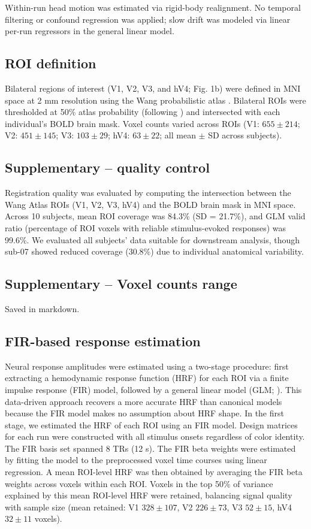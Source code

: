 Within-run head motion was estimated via rigid-body realignment. No temporal filtering or confound regression was applied; slow drift was modeled via linear per-run regressors in the general linear model.

\subsection*{ROI definition}

Bilateral regions of interest (V1, V2, V3, and hV4; Fig. 1b) were defined in MNI space at 2 mm resolution using the Wang probabilistic atlas \cite{wang2015}. Bilateral ROIs were thresholded at 50\% atlas probability (following ) and intersected with each individual's BOLD brain mask. Voxel counts varied across ROIs (V1: $655 \pm 214$; V2: $451 \pm 145$; V3: $103 \pm 29$; hV4: $63 \pm 22$; all mean $\pm$ SD across subjects).

\subsection*{Supplementary -- quality control}

Registration quality was evaluated by computing the intersection between the Wang Atlas ROIs (V1, V2, V3, hV4) and the BOLD brain mask in MNI space. Across 10 subjects, mean ROI coverage was 84.3\% (SD = 21.7\%), and GLM valid ratio (percentage of ROI voxels with reliable stimulus-evoked responses) was 99.6\%. We evaluated all subjects' data suitable for downstream analysis, though sub-07 showed reduced coverage (30.8\%) due to individual anatomical variability.

\subsection*{Supplementary -- Voxel counts range}

Saved in markdown.

\subsection*{FIR-based response estimation}

Neural response amplitudes were estimated using a two-stage procedure: first extracting a hemodynamic response function (HRF) for each ROI via a finite impulse response (FIR) model, followed by a general linear model (GLM; ). This data-driven approach recovers a more accurate HRF than canonical models because the FIR model makes no assumption about HRF shape. In the first stage, we estimated the HRF of each ROI using an FIR model. Design matrices for each run were constructed with all stimulus onsets regardless of color identity. The FIR basis set spanned 8 TRs (12 s). The FIR beta weights were estimated by fitting the model to the preprocessed voxel time courses using linear regression. A mean ROI-level HRF was then obtained by averaging the FIR beta weights across voxels within each ROI. Voxels in the top 50\% of variance explained by this mean ROI-level HRF were retained, balancing signal quality with sample size (mean retained: V1 $328 \pm 107$, V2 $226 \pm 73$, V3 $52 \pm 15$, hV4 $32 \pm 11$ voxels).

